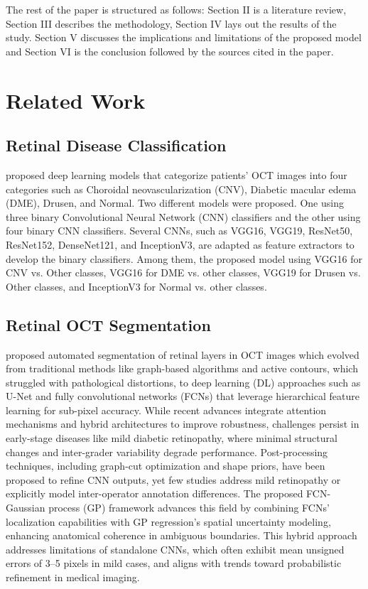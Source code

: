 \documentclass[conference]{IEEEtran}
\begin{document}
The rest of the paper is structured as follows: Section II is a literature review, Section III describes the methodology, Section IV lays out the results of the study. Section V discusses the implications and limitations of the proposed model and Section VI is the conclusion followed by the sources cited in the paper.

\section{Related Work}
\subsection{Retinal Disease Classification}
\cite{retinalclass} proposed deep learning models that categorize patients' OCT images into four categories such as Choroidal neovascularization (CNV), Diabetic macular edema (DME), Drusen, and Normal. Two different models were proposed. One using three binary Convolutional Neural Network (CNN) classifiers and the other using four binary CNN classifiers. Several CNNs, such as VGG16, VGG19, ResNet50, ResNet152, DenseNet121, and InceptionV3, are adapted as feature extractors to develop the binary classifiers. Among them, the proposed model using VGG16 for CNV vs. Other classes, VGG16 for DME vs. other classes, VGG19 for Drusen vs. Other classes, and InceptionV3 for Normal vs. other classes.

\subsection{Retinal OCT Segmentation}
\cite{pekala2018deeplearningbasedretinal} proposed automated segmentation of retinal layers in OCT images which evolved from traditional methods like graph-based algorithms and active contours, which struggled with pathological distortions, to deep learning (DL) approaches such as U-Net and fully convolutional networks (FCNs) that leverage hierarchical feature learning for sub-pixel accuracy. While recent advances integrate attention mechanisms and hybrid architectures to improve robustness, challenges persist in early-stage diseases like mild diabetic retinopathy, where minimal structural changes and inter-grader variability degrade performance. Post-processing techniques, including graph-cut optimization and shape priors, have been proposed to refine CNN outputs, yet few studies address mild retinopathy or explicitly model inter-operator annotation differences. The proposed FCN-Gaussian process (GP) framework advances this field by combining FCNs’ localization capabilities with GP regression’s spatial uncertainty modeling, enhancing anatomical coherence in ambiguous boundaries. This hybrid approach addresses limitations of standalone CNNs, which often exhibit mean unsigned errors of 3–5 pixels in mild cases, and aligns with trends toward probabilistic refinement in medical imaging.
\end{document}
